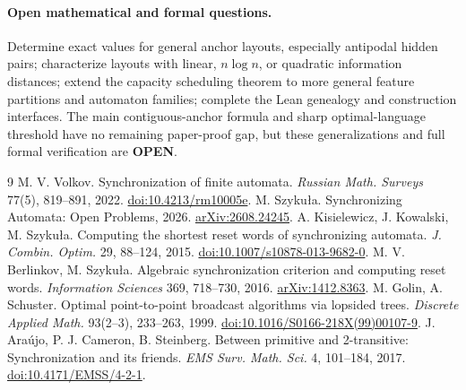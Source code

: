 \documentclass[11pt]{article}
\begin{document}
\paragraph{Open mathematical and formal questions.}
Determine exact values for general anchor layouts, especially antipodal
hidden pairs; characterize layouts with linear, $n\log n$, or quadratic
information distances; extend the capacity scheduling theorem to more
general feature partitions and automaton families; complete the Lean
genealogy and construction interfaces. The main contiguous-anchor formula
and sharp optimal-language threshold
have no remaining paper-proof gap, but these generalizations and full
formal verification are \textbf{OPEN}.

\begin{thebibliography}{9}
 M. V. Volkov.
Synchronization of finite automata.
\emph{Russian Math. Surveys} 77(5), 819--891, 2022.
\href{https://www.mathnet.ru/eng/rm10005}{doi:10.4213/rm10005e}.
 M. Szyku{\l}a.
Synchronizing Automata: Open Problems, 2026.
\href{https://arxiv.org/abs/2608.24245}{arXiv:2608.24245}.
 A. Kisielewicz, J. Kowalski, M. Szyku{\l}a.
Computing the shortest reset words of synchronizing automata.
\emph{J. Combin. Optim.} 29, 88--124, 2015.
\href{https://doi.org/10.1007/s10878-013-9682-0}{doi:10.1007/s10878-013-9682-0}.
 M. V. Berlinkov, M. Szyku{\l}a.
Algebraic synchronization criterion and computing reset words.
\emph{Information Sciences} 369, 718--730, 2016.
\href{https://arxiv.org/abs/1412.8363}{arXiv:1412.8363}.
 M. Golin, A. Schuster.
Optimal point-to-point broadcast algorithms via lopsided trees.
\emph{Discrete Applied Math.} 93(2--3), 233--263, 1999.
\href{https://doi.org/10.1016/S0166-218X(99)00107-9}{doi:10.1016/S0166-218X(99)00107-9}.
 J. Ara{\'u}jo, P. J. Cameron, B. Steinberg.
Between primitive and 2-transitive: Synchronization and its friends.
\emph{EMS Surv. Math. Sci.} 4, 101--184, 2017.
\href{https://doi.org/10.4171/EMSS/4-2-1}{doi:10.4171/EMSS/4-2-1}.
\end{thebibliography}
\end{document}
